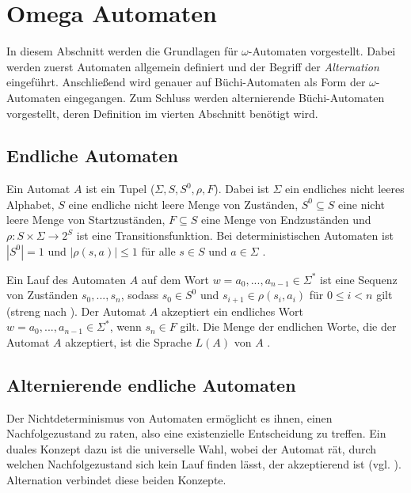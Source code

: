 \section{Omega Automaten}

In diesem Abschnitt werden die Grundlagen für $\omega$-Automaten vorgestellt. Dabei werden zuerst Automaten allgemein definiert und der Begriff der \textit{Alternation} eingeführt. Anschließend wird genauer auf Büchi-Automaten als Form der $\omega$-Automaten eingegangen. Zum Schluss werden alternierende Büchi-Automaten vorgestellt, deren Definition im vierten Abschnitt benötigt wird. 

\subsection{Endliche Automaten}
Ein Automat $A$ ist ein Tupel ($\Sigma, S, S^0, \rho, F$). Dabei ist $\Sigma$ ein endliches nicht leeres Alphabet, $S$ eine endliche nicht leere Menge von Zuständen, $S^0\subseteq S$ eine nicht leere Menge von Startzuständen, $F\subseteq S$ eine Menge von Endzuständen und $\rho : S \times \Sigma \rightarrow 2^S$ ist eine Transitionsfunktion. Bei deterministischen Automaten ist $|S^0|=1$ und $|\rho(s,a)|\leq 1$ für alle $s\in S$ und $a \in \Sigma$ \cite{vardi+96}.

Ein Lauf des Automaten $A$ auf dem Wort $w=a_0,...,a_{n-1}\in \Sigma^\ast$ ist eine Sequenz von Zuständen $s_0,...,s_n$, sodass $s_0 \in S^0$ und $s_{i+1} \in \rho(s_i, a_i)$ für $0\leq i<n$ gilt (streng nach \cite{vardi+96}). Der Automat $A$ akzeptiert ein endliches Wort $w=a_0,...,a_{n-1}\in\Sigma^\ast$, wenn $s_n\in F$ gilt. Die Menge der endlichen Worte, die der Automat $A$ akzeptiert, ist die Sprache $L(A)$ von $A$ \cite{vardi+96}. 

\subsection{Alternierende endliche Automaten}
\label{AEA}
Der Nichtdeterminismus von Automaten ermöglicht es ihnen, einen Nachfolgezustand zu raten, also eine existenzielle Entscheidung zu treffen. Ein duales Konzept dazu ist die universelle Wahl, wobei der Automat rät, durch welchen Nachfolgezustand sich kein Lauf finden lässt, der akzeptierend ist (vgl. \cite{hofmann11}). Alternation verbindet diese beiden Konzepte. 

